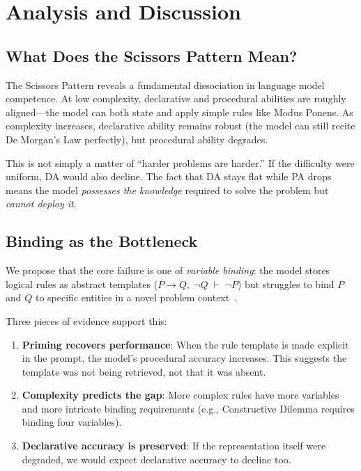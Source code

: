\documentclass{article}
\newcommand{\da}{\textsc{DA}}
\newcommand{\pa}{\textsc{PA}}
\begin{document}
\section{Analysis and Discussion}

\subsection{What Does the Scissors Pattern Mean?}

The Scissors Pattern reveals a fundamental dissociation in language
model competence.
At low complexity, declarative and procedural abilities are roughly
aligned---the model can both state and apply simple rules like
Modus Ponens.
As complexity increases, declarative ability remains robust (the
model can still recite De Morgan's Law perfectly), but procedural
ability degrades.

This is not simply a matter of ``harder problems are harder.''
If the difficulty were uniform, \da{} would also decline.
The fact that \da{} stays flat while \pa{} drops means the model
\emph{possesses the knowledge} required to solve the problem but
\emph{cannot deploy it}.

\subsection{Binding as the Bottleneck}

We propose that the core failure is one of \emph{variable binding}:
the model stores logical rules as abstract templates
($P \to Q,\; \neg Q \;\vdash\; \neg P$) but struggles to bind
$P$ and $Q$ to specific entities in a novel problem
context~\cite{greff2020binding}.

Three pieces of evidence support this:
\begin{enumerate}
    \item \textbf{Priming recovers performance}: When the rule
    template is made explicit in the prompt, the model's procedural
    accuracy increases. This suggests the template was not being
    retrieved, not that it was absent.
    \item \textbf{Complexity predicts the gap}: More complex rules
    have more variables and more intricate binding requirements
    (e.g., Constructive Dilemma requires binding four variables).
    \item \textbf{Declarative accuracy is preserved}: If the
    representation itself were degraded, we would expect declarative
    accuracy to decline too.
\end{enumerate}
\end{document}
